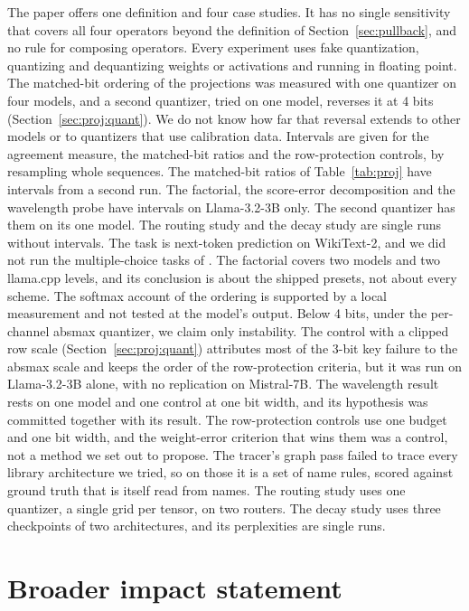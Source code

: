 \documentclass[10pt]{article}
\begin{document}
The paper offers one definition and four case studies. It has no single sensitivity that covers
all four operators beyond the definition of Section~\ref{sec:pullback}, and no rule for composing
operators. Every experiment uses fake quantization, quantizing and dequantizing weights or
activations and running in floating point. The matched-bit ordering of the projections was
measured with one quantizer on four models, and a second quantizer, tried on one model,
reverses it at 4 bits (Section~\ref{sec:proj:quant}). We do not know how far that reversal
extends to other models or to quantizers that use calibration data. Intervals are given for the agreement measure, the matched-bit ratios and the
row-protection controls, by resampling whole sequences. The matched-bit ratios of Table~\ref{tab:proj} have intervals from a
second run. The factorial, the score-error decomposition and the wavelength probe have intervals
on Llama-3.2-3B only. The second quantizer has them on its one model. The routing study and the
decay study are single runs without intervals. The task is next-token prediction on WikiText-2, and we did not run the
multiple-choice tasks of \citet{rababah2026illusion}. The factorial covers two models and two
llama.cpp levels, and its conclusion is about the shipped presets, not about every scheme. The
softmax account of the ordering is supported by a local measurement and not tested at the
model's output. Below 4 bits, under the per-channel absmax quantizer, we claim only instability. The control with a clipped row scale
(Section~\ref{sec:proj:quant}) attributes most of the 3-bit key failure to the absmax scale and
keeps the order of the row-protection criteria, but it was run on Llama-3.2-3B alone, with no
replication on Mistral-7B. The wavelength result rests on one
model and one control at one bit width, and its hypothesis was committed together with its
result. The row-protection controls use one budget and one bit width,
and the weight-error criterion that wins them was a control, not a method we set out to propose.
The tracer's graph pass failed to trace every library architecture we tried, so on those it is a set of name rules, scored against ground truth that is itself read from names. The routing study uses one quantizer, a
single grid per tensor, on two routers. The decay study uses three checkpoints of two architectures, and its perplexities are single
runs.

\section*{Broader impact statement}
\end{document}
